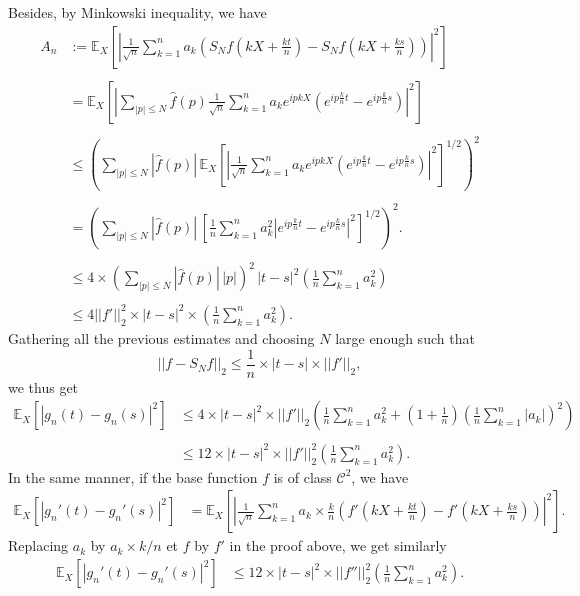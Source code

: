 \documentclass{svproc}
\begin{document}
Besides, by Minkowski inequality, we have 
\[
\begin{array}{ll}
A_n & := \displaystyle{ \mathbb E_X \left[\left| \frac{1}{\sqrt{n}} \sum_{k=1}^n a_k  \left( S_N f\left(kX+\frac{kt}{n}\right)-S_N f\left(kX+\frac{ks}{n}\right)\right)\right|^2  \right]} \\
\\
& = \displaystyle{ \mathbb E_X \left[\left| \sum_{|p|\leq N} \widehat{f}(p) \frac{1}{\sqrt{n}} \sum_{k=1}^n a_k  e^{ip kX} 
\left( e^{i p\frac{k}{n}t} -e^{i p\frac{k}{n}s} \right)\right|^2  \right]} \\
\\
& \leq  \displaystyle{ \left(  \sum_{|p|\leq N} |\widehat{f}(p)|  \, \mathbb E_X \left[ \left| \frac{1}{\sqrt{n}} \sum_{k=1}^n a_k  e^{ip kX} 
\left( e^{i p\frac{k}{n}t} -e^{i p\frac{k}{n}s} \right)\right|^2  \right]^{1/2} \right)^2}\\
\\
& =  \displaystyle{ \left(  \sum_{|p|\leq N} |\widehat{f}(p)|  \,  \left[\frac{1}{n} \sum_{k=1}^n a_k^2  
\left| e^{i p\frac{k}{n}t} -e^{i p\frac{k}{n}s} \right|^2  \right]^{1/2} \right)^2}.
\\
\\
& \leq 4 \times \displaystyle{\left(  \sum_{|p|\leq N} |\widehat{f}(p)| \, |p| \right)^2 \,  |t -s|^{2} \left(\frac{1}{n} \sum_{k=1}^n a_k^2   \right)} \\
\\
&  \displaystyle{ \leq4  ||f'||_2^2\times   |t -s|^{2} \times \left(\frac{1}{n} \sum_{k=1}^n a_k^2  \right) }.
  \end{array} 
\]
Gathering all the previous estimates and choosing $N$ large enough such that 
\[
||f-S_Nf||_2 \leq \frac{1}{n} \times |t-s| \times ||f'||_2,
\]
we thus get 
\[
\begin{array}{ll}
\displaystyle{ \mathbb E_X \left[\left| g_n\left(t \right)-g_n\left(s\right)\right|^2  \right] }& \displaystyle{  \leq   4\times  |t-s|^2 \times ||f'||_2 \left(  \frac{1}{n} \sum_{k=1}^n a_k^2 +\left( 1 +\frac{1}{n}\right) \left( \frac{1}{n} \sum_{k=1}^n |a_k|\right)^2  \right)}\\
\\
&  \displaystyle{\leq   12 \times |t-s|^2 \times ||f'||_2^2 \left(  \frac{1}{n} \sum_{k=1}^n a_k^2   \right).}
 \end{array}
\]
In the same manner,  if the base function $f$ is of class $\mathcal C^2$, we have 
\[
\begin{array}{ll}
\displaystyle{ \mathbb E_X \left[\left| g_n'\left(t \right)-g_n'\left(s\right)\right|^2  \right] } & 
 \displaystyle{= \mathbb E_X \left[\left| \frac{1}{\sqrt{n}} \sum_{k=1}^n a_k \times \frac{k}{n}  \left( f'\left(kX+\frac{kt}{n}\right)-f'\left(kX+\frac{ks}{n}\right)\right)\right|^2  \right]}.
 \end{array}
\]
Replacing $a_k$ by $a_k \times k/n$ et $f$ by $f'$ in the proof above, we get similarly 
\[
\begin{array}{ll}
\displaystyle{ \mathbb E_X \left[\left| g_n'\left(t \right)-g_n'\left(s\right)\right|^2  \right] } & 
 \displaystyle{\leq   12 \times |t-s|^2 \times ||f''||_2^2 \left(  \frac{1}{n} \sum_{k=1}^n a_k^2   \right).}
 \end{array}
\]
\end{document}
